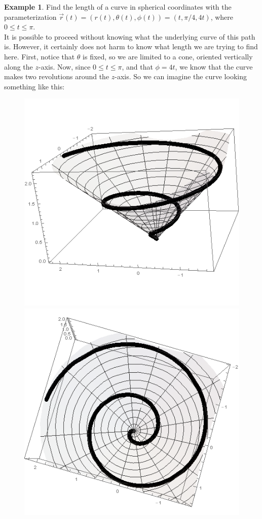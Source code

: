 \documentclass{article}
\theoremstyle{definition}
\newtheorem{exmp}{Example}[section]
\begin{document}
\begin{exmp}
Find the length of a curve in spherical coordinates with the parameterization $\vec{r}(t) = (r(t), \theta(t),\phi(t)) = (t,\pi/4,4t)$, where $0\leq t \leq \pi$.\\

It is possible to proceed without knowing what the underlying curve of this path is. However, it certainly does not harm to know what length we are trying to find here. First, notice that $\theta$ is fixed, so we are limited to a cone, oriented vertically along the $z$-axis. Now, since $0 \leq t \leq \pi$, and that $\phi = 4t$, we know that the curve makes two revolutions around the $z$-axis. So we can imagine the curve looking something like this:
\begin{figure}[h!]
	\centering
	\includegraphics[scale=0.35]{gr-fig-9a.png}
	\includegraphics[scale=0.35]{gr-fig-9b.png}

\end{figure}
\end{exmp}
\end{document}
